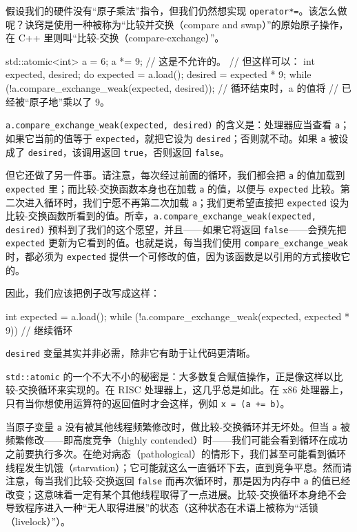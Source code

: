 假设我们的硬件没有“原子乘法”指令，但我们仍然想实现 \texttt{operator*=}。该怎么做呢？诀窍是使用一种被称为“比较并交换（compare and swap）”的原始原子操作，在 C++ 里则叫“比较-交换（compare-exchange）”。

\begin{codebox}[cpp]
    std::atomic<int> a = 6;
    a *= 9; // 这是不允许的。
    // 但这样可以：
    int expected, desired;
    do {
      expected = a.load();
      desired = expected * 9;
    } while (!a.compare_exchange_weak(expected, desired));
    // 循环结束时，a 的值将
    // 已经被“原子地”乘以了 9。
\end{codebox}

\texttt{a.\allowbreak{}compare\_\allowbreak{}exchange\_\allowbreak{}weak(\allowbreak{}expected,\allowbreak{} desired)\allowbreak{}} 的含义是：处理器应当查看 \texttt{a}；如果它当前的值等于 \texttt{expected}，就把它设为 \texttt{desired}；否则就不动。如果 \texttt{a} 被设成了 \texttt{desired}，该调用返回 \texttt{true}，否则返回 \texttt{false}。

但它还做了另一件事。请注意，每次经过前面的循环，我们都会把 \texttt{a} 的值加载到 \texttt{expected} 里；而比较-交换函数本身也在加载 \texttt{a} 的值，以便与 \texttt{expected} 比较。第二次进入循环时，我们宁愿不再第二次加载 \texttt{a}；我们更希望直接把 \texttt{expected} 设为比较-交换函数所看到的值。所幸，\texttt{a.\allowbreak{}compare\_\allowbreak{}exchange\_\allowbreak{}weak(\allowbreak{}expected,\allowbreak{} desired)\allowbreak{}} 预料到了我们的这个愿望，并且——如果它将返回 \texttt{false}——会预先把 \texttt{expected} 更新为它看到的值。也就是说，每当我们使用 \texttt{compare\_\allowbreak{}exchange\_\allowbreak{}weak} 时，都必须为 \texttt{expected} 提供一个可修改的值，因为该函数是以引用的方式接收它的。

因此，我们应该把例子改写成这样：

\begin{codebox}[cpp]
    int expected = a.load();
    while (!a.compare_exchange_weak(expected, expected * 9)) {
      // 继续循环
    }
\end{codebox}

\texttt{desired} 变量其实并非必需，除非它有助于让代码更清晰。

\texttt{std::\allowbreak{}atomic} 的一个不大不小的秘密是：大多数复合赋值操作，正是像这样以比较-交换循环来实现的。在 RISC 处理器上，这几乎总是如此。在 x86 处理器上，只有当你想使用运算符的返回值时才会这样，例如 \texttt{x = (\allowbreak{}a += b)\allowbreak{}}。

当原子变量 \texttt{a} 没有被其他线程频繁修改时，做比较-交换循环并无坏处。但当 \texttt{a} 被频繁修改——即高度竞争（highly contended）时——我们可能会看到循环在成功之前要执行多次。在绝对病态（pathological）的情形下，我们甚至可能看到循环线程发生饥饿（starvation）；它可能就这么一直循环下去，直到竞争平息。然而请注意，每当我们比较-交换返回 \texttt{false} 而再次循环时，那是因为内存中 \texttt{a} 的值已经改变；这意味着一定有某个其他线程取得了一点进展。比较-交换循环本身绝不会导致程序进入一种“无人取得进展”的状态（这种状态在术语上被称为“活锁（livelock）”）。

